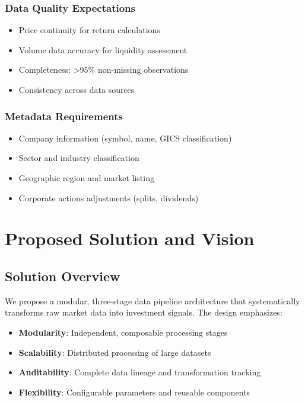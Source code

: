 \documentclass[11pt, a4paper, twoside]{article}
\begin{document}
\subsubsection{Data Quality Expectations}

\begin{itemize}
    \item Price continuity for return calculations
    \item Volume data accuracy for liquidity assessment
    \item Completeness: >95\% non-missing observations
    \item Consistency across data sources
\end{itemize}

\subsubsection{Metadata Requirements}

\begin{itemize}
    \item Company information (symbol, name, GICS classification)
    \item Sector and industry classification
    \item Geographic region and market listing
    \item Corporate actions adjustments (splits, dividends)
\end{itemize}


\section{Proposed Solution and Vision}
\label{sec:proposed-solution}

\subsection{Solution Overview}

We propose a modular, three-stage data pipeline architecture that systematically transforms raw market data into investment signals. The design emphasizes:

\begin{itemize}
    \item \textbf{Modularity}: Independent, composable processing stages
    \item \textbf{Scalability}: Distributed processing of large datasets
    \item \textbf{Auditability}: Complete data lineage and transformation tracking
    \item \textbf{Flexibility}: Configurable parameters and reusable components
\end{itemize}
\end{document}
